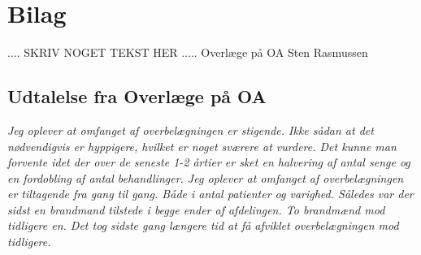 \chapter{Bilag} \label{sten}
.... SKRIV NOGET TEKST HER .....
Overlæge på OA Sten Rasmussen 
\section{Udtalelse fra Overlæge på OA}
\textit{Jeg oplever at omfanget af overbelægningen er stigende. Ikke sådan at det nødvendigvis er hyppigere, hvilket er noget sværere at vurdere. Det kunne man forvente idet der over de seneste 1-2 årtier er sket en halvering af antal senge og en fordobling af antal behandlinger.
Jeg oplever at omfanget af overbelægningen er tiltagende fra gang til gang. Både i antal patienter og varighed. Således var der sidst en brandmand tilstede i begge ender af afdelingen. To brandmænd mod tidligere en. Det tog sidste gang længere tid at få afviklet overbelægningen mod tidligere.}